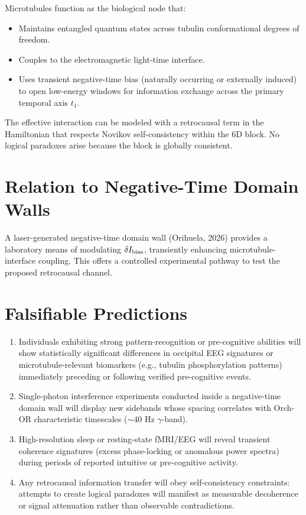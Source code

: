 \documentclass[11pt,a4paper]{article}
\begin{document}
Microtubules function as the biological node that:
\begin{itemize}
    \item Maintains entangled quantum states across tubulin conformational degrees of freedom.
    \item Couples to the electromagnetic light-time interface.
    \item Uses transient negative-time bias (naturally occurring or externally induced) to open low-energy windows for information exchange across the primary temporal axis $t_1$.
\end{itemize}

The effective interaction can be modeled with a retrocausal term in the Hamiltonian that respects Novikov self-consistency within the 6D block. No logical paradoxes arise because the block is globally consistent.

\section{Relation to Negative-Time Domain Walls}

A laser-generated negative-time domain wall (Orihuela, 2026) provides a laboratory means of modulating $\delta I_{\rm bias}$, transiently enhancing microtubule-interface coupling. This offers a controlled experimental pathway to test the proposed retrocausal channel.

\section{Falsifiable Predictions}

\begin{enumerate}
    \item Individuals exhibiting strong pattern-recognition or pre-cognitive abilities will show statistically significant differences in occipital EEG signatures or microtubule-relevant biomarkers (e.g., tubulin phosphorylation patterns) immediately preceding or following verified pre-cognitive events.
    \item Single-photon interference experiments conducted inside a negative-time domain wall will display new sidebands whose spacing correlates with Orch-OR characteristic timescales ($\sim$40 Hz $\gamma$-band).
    \item High-resolution sleep or resting-state fMRI/EEG will reveal transient coherence signatures (excess phase-locking or anomalous power spectra) during periods of reported intuitive or pre-cognitive activity.
    \item Any retrocausal information transfer will obey self-consistency constraints: attempts to create logical paradoxes will manifest as measurable decoherence or signal attenuation rather than observable contradictions.
\end{enumerate}
\end{document}
